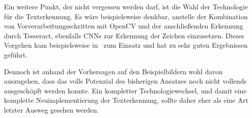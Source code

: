 Ein weitere Punkt, der nicht vergessen werden darf, ist die Wahl der
Technologie f\"ur die Texterkennung.
Es w\"are beispielsweise denkbar, anstelle der Kombination von
Vorverarbeitungsschritten mit OpenCV und der anschlie{\ss}enden
Erkennung durch Tesseract, ebenfalls CNNs zur Erkennung der
Zeichen einzusetzen.
Dieses Vorgehen kam beispielsweise in~\cite{silva2018a} zum Einsatz und
hat zu sehr guten Ergebnissen gef\"uhrt.

Dennoch ist anhand der Vorhersagen auf den Beispielbildern
wohl davon auszugehen, dass das volle Potenzial des bisherigen
Ansatzes noch nicht vollends ausgesch\"opft werden konnte.
Ein kompletter Technologiewechsel, und damit eine komplette
Neuimplementierung der Texterkennung, sollte daher eher als eine
Art letzter Ausweg gesehen werden.
